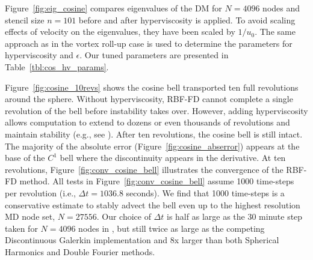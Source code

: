 \documentclass{report}
\begin{document}
Figure~\ref{fig:eig_cosine} compares eigenvalues of the DM for $N=4096$ nodes and stencil size $n=101$ before and after hyperviscosity is applied. To avoid scaling effects of velocity on the eigenvalues, they have been scaled by $1/u_0$.  The same approach as in the vortex roll-up case is used to determine the parameters for hyperviscosity and $\epsilon$. Our tuned parameters are presented in 
Table~\ref{tbl:cos_hv_params}.


Figure~\ref{fig:cosine_10revs} shows the cosine bell transported ten full revolutions around the sphere. Without hyperviscosity, RBF-FD cannot complete a single revolution of the bell before instability takes over. However, adding hyperviscosity allows computation to extend to dozens or even thousands of revolutions and maintain stability (e.g., see \cite{FornbergLehto11}). After ten revolutions, the cosine bell is still intact. The majority of the absolute error (Figure~\ref{fig:cosine_abserror}) appears at the base of the $C^1$ bell where the discontinuity appears in the derivative. At ten revolutions, Figure~\ref{fig:conv_cosine_bell} illustrates the convergence of the RBF-FD method. All tests in Figure~\ref{fig:conv_cosine_bell} assume 1000 time-steps per revolution (i.e., $\Delta t = 1036.8$ seconds). We find that 1000 time-steps is a conservative estimate to stably advect the bell even up to the highest resolution MD node set, $N=27556$. Our choice of $\Delta t$ is half as large as the 30 minute step taken for $N=4096$ nodes in \cite{FlyerWright07}, but still twice as large as the competing Discontinuous Galerkin implementation and 8x larger than both Spherical Harmonics and Double Fourier methods.

\end{document}
